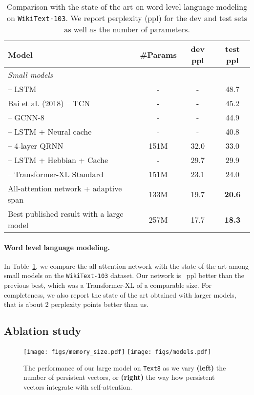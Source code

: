 \documentclass{article}
\begin{document}
\begin{table}[t]
\centering
\caption{
Comparison with the state of the art on word level language modeling on \texttt{WikiText-103}.
We report perplexity (ppl) for the dev and test sets as well as the number of parameters.
}
\label{tab:wikitext103}
\begin{tabular}{lccc}
\toprule
Model & \#Params & dev ppl & test ppl\\
\midrule
\multicolumn{4}{l}{\emph{Small models}}\\
\citet{grave2016improving} – LSTM & - & - & 48.7\\
Bai et al. (2018) – TCN & - & - & 45.2\\
\citet{dauphin2017language} – GCNN-8 & - & - & 44.9\\
\citet{grave2016improving} – LSTM + Neural cache & - & - & 40.8\\
\citet{merity2018analysis} – 4-layer QRNN & 151M & 32.0 & 33.0\\
\citet{rae2018fast} – LSTM + Hebbian + Cache & - & 29.7 & 29.9\\
\citet{dai2019transformer} – Transformer-XL Standard & 151M & 23.1 & 24.0\\
All-attention network + adaptive span                       & 133M & 19.7  & \bf  20.6 \\
\midrule
Best published result with a large model~\citep{dai2019transformer} & 257M & 17.7 & \bf 18.3 \\
\bottomrule
\end{tabular}
\end{table}


\paragraph{Word level language modeling.}
In Table~\ref{tab:wikitext103}, we compare the all-attention network with the state of the art among small models on the \texttt{WikiText-103} dataset.
Our network is ~ppl better than the previous best, which was a Transformer-XL of a comparable size.
For completeness, we also report the state of the art obtained with larger models, that is about 2 perplexity points better than us.

\subsection{Ablation study}
\begin{figure}
  \centering
  \texttt{[image: figs/memory\_size.pdf]}
  \texttt{[image: figs/models.pdf]} \\
  \caption{The performance of our large model on \texttt{Text8} as we vary {\bf(left)} the number of persistent vectors, or {\bf (right)} the way how persistent vectors integrate with self-attention.}
  \label{fig:memsz}
\end{figure}
\end{document}
